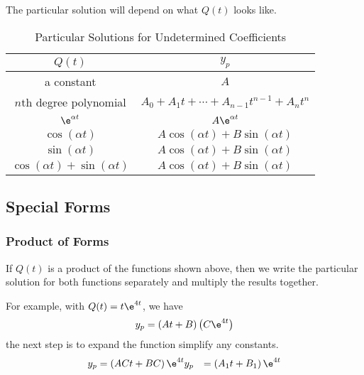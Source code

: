 \documentclass{article}
\begin{document}
The particular solution will depend on what $Q(t)$ looks like.
\begin{table}[H]
    \centering
    \begin{tabular}{c | c}
        \toprule
        $Q(t)$                                                          & $y_p$                                                             \\
        \midrule
        a constant                                                      & $A$                                                               \\
        $n$th degree polynomial                                         & $A_0 + A_1t + \cdots + A_{n-1}t^{n-1} + A_nt^n$                   \\
        $\e^{\alpha t}$                                                 & $A\e^{\alpha t}$                                                  \\
        $\cos{\left( \alpha t \right)}$                                 & $A\cos{\left( \alpha t \right)} + B\sin{\left( \alpha t \right)}$ \\
        $\sin{\left( \alpha t \right)}$                                 & $A\cos{\left( \alpha t \right)} + B\sin{\left( \alpha t \right)}$ \\
        $\cos{\left( \alpha t \right)} + \sin{\left( \alpha t \right)}$ & $A\cos{\left( \alpha t \right)} + B\sin{\left( \alpha t \right)}$ \\
        \bottomrule
    \end{tabular}
    \caption{Particular Solutions for Undetermined Coefficients}
\end{table}
\subsection{Special Forms}
\subsubsection{Product of Forms}
If $Q(t)$ is a product of the functions shown above, then we write the
particular solution for both functions separately and multiply the results together.

For example, with $Q(t) = t \e^{4t}$, we have
\begin{equation*}
    y_p = \left(At + B\right) \left(C\e^{4t}\right)
\end{equation*}
the next step is to expand the function simplify any constants.
\begin{align*}
    y_p & = \left(ACt + BC\right) \e^{4t}
    y_p & = \left(A_1t + B_1\right) \e^{4t}
\end{align*}
\end{document}
